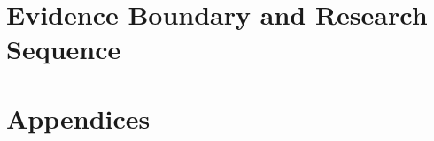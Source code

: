 \documentclass[12pt,oneside]{report}
\theoremstyle{monographplain}
\theoremstyle{monographdefinition}
\begin{document}
\part{Evidence Boundary and Research Sequence}



\appendix
\part*{Appendices}















{\RaggedRight
\hfuzz=0.2pt
\printbibliography[title={References}]
}
\printindex
\end{document}
